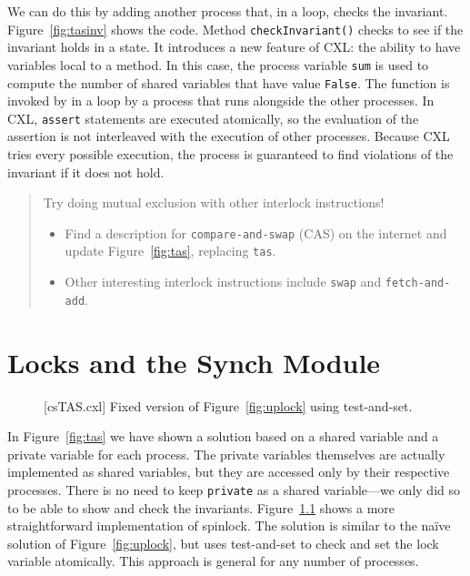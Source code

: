 \documentclass{report}
\newenvironment{code}{
\tcolorbox
}{
\endtcolorbox
}
\begin{document}
We can do this by adding another process that, in a loop,
checks the invariant.  Figure~\ref{fig:tasinv} shows the code.
Method \texttt{checkInvariant()} checks to see if the invariant holds
in a state.  It introduces a new feature of CXL: the ability to have
variables local to a method.  In this case, the process variable \texttt{sum}
is used to compute the number of shared variables that have value
\texttt{False}.
The function is invoked by in a loop by a process that runs alongside
the other processes.
In CXL, \texttt{assert} statements are executed atomically, so the
evaluation of the assertion is not interleaved with the execution
of other processes.
Because CXL tries every possible execution, the process is guaranteed
to find violations of the invariant if it does not hold.

\begin{quote}
Try doing mutual exclusion with other interlock instructions!
\begin{itemize}
\item Find a description for \texttt{compare-and-swap} (CAS)
on the internet and
update Figure~\ref{fig:tas}, replacing \texttt{tas}.
\item Other interesting interlock instructions include \texttt{swap} and
\texttt{fetch-and-add}.
\end{itemize}
\end{quote}

\chapter{Locks and the Synch Module}

\begin{figure}
\begin{code}
\end{code}
\caption{[csTAS.cxl] Fixed version of Figure~\ref{fig:uplock} using test-and-set.}
\label{fig:tas2}
\end{figure}

In Figure~\ref{fig:tas} we have shown a solution based on a shared
variable and a private variable for each process.   The private
variables themselves are actually implemented as shared variables,
but they are accessed only by their respective processes.
There is no need to keep \texttt{private} as a shared
variable---we only did so to be able to show and check the invariants.
Figure~\ref{fig:tas2} shows a more straightforward implementation of spinlock.
The solution is similar to the na\"{i}ve solution of Figure~\ref{fig:uplock},
but uses test-and-set to check and set the lock variable atomically.
This approach is general for any number of processes.
\end{document}
